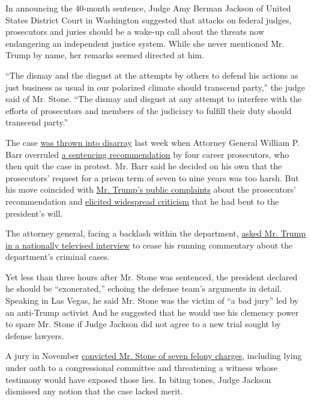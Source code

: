 In announcing the 40-month sentence, Judge Amy Berman Jackson of United
States District Court in Washington suggested that attacks on federal
judges, prosecutors and juries should be a wake-up call about the
threats now endangering an independent justice system. While she never
mentioned Mr. Trump by name, her remarks seemed directed at him.

``The dismay and the disgust at the attempts by others to defend his
actions as just business as usual in our polarized climate should
transcend party,'' the judge said of Mr. Stone. ``The dismay and disgust
at any attempt to interfere with the efforts of prosecutors and members
of the judiciary to fulfill their duty should transcend party.''

The case
\href{https://www.nytimes.com/2020/02/11/us/politics/roger-stone-sentencing.html}{was
thrown into disarray} last week when Attorney General William P. Barr
overruled
\href{https://www.nytimes.com/2020/02/10/us/roger-stone-prison-sentence.html}{a
sentencing recommendation} by four career prosecutors, who then quit the
case in protest. Mr. Barr said he decided on his own that the
prosecutors' request for a prison term of seven to nine years was too
harsh. But his move coincided with
\href{https://www.nytimes.com/2020/02/14/us/politics/trump-william-barr.html}{Mr.
Trump's public complaints} about the prosecutors' recommendation and
\href{https://www.nytimes.com/2020/02/12/us/politics/justice-department-roger-stone-sentencing.html}{elicited
widespread criticism} that he had bent to the president's will.

The attorney general, facing a backlash within the department,
\href{https://www.nytimes.com/2020/02/13/us/politics/william-barr-trump.html}{asked
Mr. Trump in a nationally televised interview} to cease his running
commentary about the department's criminal cases.

Yet less than three hours after Mr. Stone was sentenced, the president
declared he should be ``exonerated,'' echoing the defense team's
arguments in detail. Speaking in Las Vegas, he said Mr. Stone was the
victim of ``a bad jury'' led by an anti-Trump activist And he suggested
that he would use his clemency power to spare Mr. Stone if Judge Jackson
did not agree to a new trial sought by defense lawyers.

A jury in November
\href{https://www.nytimes.com/2019/11/15/us/politics/roger-stone-trial-guilty.html}{convicted
Mr. Stone of seven felony charges}, including lying under oath to a
congressional committee and threatening a witness whose testimony would
have exposed those lies. In biting tones, Judge Jackson dismissed any
notion that the case lacked merit.

